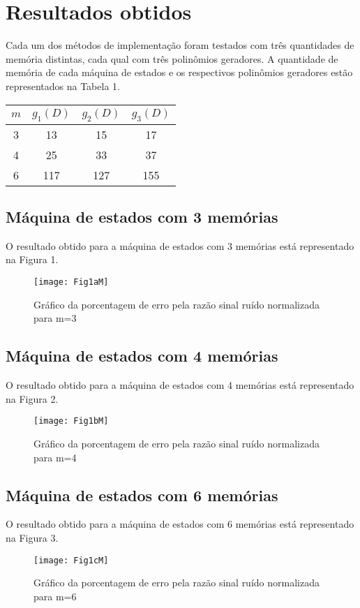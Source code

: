 \section{Resultados obtidos}

Cada um dos métodos de implementação foram testados com três quantidades de memória distintas, cada qual com três polinômios geradores. A quantidade de memória de cada máquina de estados e os respectivos polinômios geradores estão representados na Tabela 1.

\begin{table}[H]
	\centering
	\captionsetup{font=scriptsize}
	 \label{tab:title2}
	\begin{tabular}{c|ccc}
		\textbf{$m$} & \textbf{$g_{1}(D)$} & \textbf{$g_{2}(D)$} & \textbf{$g_{3}(D)$} \\ \hline
		3 & 13 & 15 & 17 \\
		4 & 25 & 33 & 37 \\
		6 & 117 & 127 & 155
	\end{tabular}
\end{table}

\subsection{Máquina de estados com 3 memórias}

O resultado obtido para a máquina de estados com 3 memórias está representado na Figura 1.

\begin{figure}[H]
\centering
\texttt{[image: Fig1aM]}
\captionsetup{font=scriptsize}
\caption{Gráfico da porcentagem de erro pela razão sinal ruído normalizada para m=3}
\end{figure}

\subsection{Máquina de estados com 4 memórias}

O resultado obtido para a máquina de estados com 4 memórias está representado na Figura 2.

\begin{figure}[H]
	\centering
	\texttt{[image: Fig1bM]}
	\captionsetup{font=scriptsize}
	\caption{Gráfico da porcentagem de erro pela razão sinal ruído normalizada para m=4}
\end{figure}

\subsection{Máquina de estados com 6 memórias}

O resultado obtido para a máquina de estados com 6 memórias está representado na Figura 3.

\begin{figure}[H]
	\centering
	\texttt{[image: Fig1cM]}
	\captionsetup{font=scriptsize}
	\caption{Gráfico da porcentagem de erro pela razão sinal ruído normalizada para m=6}
\end{figure}